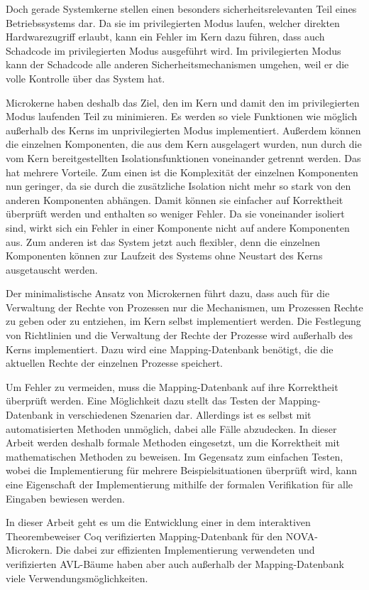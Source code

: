 \documentclass[a4paper, parskip]{scrartcl}
\begin{document}
Doch gerade Systemkerne stellen einen besonders sicherheitsrelevanten Teil eines Betriebssystems dar.
Da sie im privilegierten Modus laufen, welcher direkten Hardwarezugriff erlaubt, kann ein Fehler im Kern dazu führen, dass auch Schadcode im privilegierten Modus ausgeführt wird.
Im privilegierten Modus kann der Schadcode alle anderen Sicherheitsmechanismen umgehen, weil er die volle Kontrolle über das System hat.

Microkerne haben deshalb das Ziel, den im Kern und damit den im privilegierten Modus laufenden Teil zu minimieren. 
Es werden so viele Funktionen wie möglich außerhalb des Kerns im unprivilegierten Modus implementiert. 
Außerdem können die einzelnen Komponenten, die aus dem Kern ausgelagert wurden, nun durch die vom Kern bereitgestellten Isolationsfunktionen voneinander getrennt werden. 
Das hat mehrere Vorteile.
Zum einen ist die Komplexität der einzelnen Komponenten nun geringer, da sie durch die zusätzliche Isolation nicht mehr so stark von den anderen Komponenten abhängen. 
Damit können sie einfacher auf Korrektheit überprüft werden und enthalten so weniger Fehler. 
Da sie voneinander isoliert sind, wirkt sich ein Fehler in einer Komponente nicht auf andere Komponenten aus.
Zum anderen ist das System jetzt auch flexibler, denn die einzelnen Komponenten können zur Laufzeit des Systems ohne Neustart des Kerns ausgetauscht werden.

Der minimalistische Ansatz von Microkernen führt dazu, dass auch für die Verwaltung der Rechte von Prozessen nur die Mechanismen, um Prozessen Rechte zu geben oder zu entziehen, im Kern selbst implementiert werden.
Die Festlegung von Richtlinien und die Verwaltung der Rechte der Prozesse wird außerhalb des Kerns implementiert.
Dazu wird eine Mapping-Datenbank benötigt, die die aktuellen Rechte der einzelnen Prozesse speichert.

Um Fehler zu vermeiden, muss die Mapping-Datenbank auf ihre Korrektheit überprüft werden.
Eine Möglichkeit dazu stellt das Testen der Mapping-Datenbank in verschiedenen Szenarien dar.
Allerdings ist es selbst mit automatisierten Methoden unmöglich, dabei alle Fälle abzudecken.
In dieser Arbeit werden deshalb formale Methoden eingesetzt, um die Korrektheit mit mathematischen Methoden zu beweisen.
Im Gegensatz zum einfachen Testen, wobei die Implementierung für mehrere Beispielsituationen überprüft wird, kann eine Eigenschaft der Implementierung mithilfe der formalen Verifikation für alle Eingaben bewiesen werden.

In dieser Arbeit geht es um die Entwicklung einer in dem interaktiven Theorembeweiser Coq\autocite{coq-web} verifizierten Mapping-Datenbank für den NOVA-Microkern.
Die dabei zur effizienten Implementierung verwendeten und verifizierten AVL-Bäume haben aber auch außerhalb der Mapping-Datenbank viele Verwendungsmöglichkeiten. 
\end{document}
